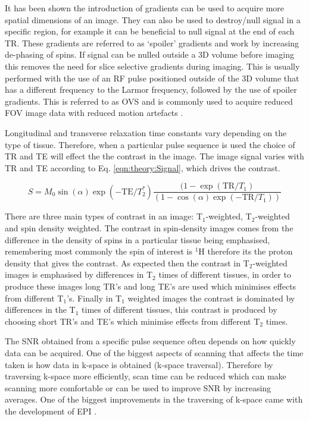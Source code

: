 It has been shown the introduction of gradients can be used to acquire more spatial dimensions of an image. They can also be used to destroy/null signal in a specific region, for example it can be beneficial to null signal at the end of each \ac{TR}. These gradients are referred to as `spoiler' gradients and work by increasing de-phasing of spins. If signal can be nulled outside a 3D volume before imaging this removes the need for slice selective gradients during imaging. This is usually performed with the use of an \ac{RF} pulse positioned outside of the 3D volume that has a different frequency to the Larmor frequency, followed by the use of spoiler gradients. This is referred to as \ac{OVS} and is commonly used to acquire reduced \ac{FOV} image data with reduced motion artefacts \cite{Smith2012ReducedSuppression}.

Longitudinal and transverse relaxation time constants vary depending on the type of tissue. Therefore, when a particular pulse sequence is used the choice of \ac{TR} and \ac{TE} will effect the the contrast in the image. The image signal varies with \ac{TR} and \ac{TE} according to Eq. \ref{eqn:theory:Signal}, which drives the contrast.

\begin{equation}
    S = M_0\sin(\alpha)\exp(-\textrm{TE}/T_2^*)\frac{(1-\exp(\textrm{TR}/T_1)}{(1-\cos(\alpha)\exp(-\textrm{TR}/T_1))}
    \label{eqn:theory:Signal}
\end{equation}

\noindent There are three main types of contrast in an image: T$_1$-weighted, T$_2$-weighted and spin density weighted. The contrast in spin-density images comes from the difference in the density of spins in a particular tissue being emphasised, remembering most commonly the spin of interest is $^1$H therefore its the proton density that gives the contrast. As expected then the contrast in T$_2$-weighted images is emphasised by differences in T$_2$ times of different tissues, in order to produce these images long \ac{TR}'s and long \ac{TE}'s are used which minimises effects from different T$_1$'s. Finally in T$_1$ weighted images the contrast is dominated by differences in the T$_1$ times of different tissues, this contrast is produced by choosing short \ac{TR}'s and \ac{TE}'s which minimise effects from different T$_2$ times. 

The \ac{SNR} obtained from a specific pulse sequence often depends on how quickly data can be acquired. One of the biggest aspects of scanning that affects the time taken is how data in k-space is obtained (k-space traversal). Therefore by traversing k-space more efficiently, scan time can be reduced which can make scanning more comfortable or can be used to improve \ac{SNR} by increasing averages. One of the biggest improvements in the traversing of k-space came with the development of \ac{EPI} \cite{Stehling1991Echo-planarSecond}.


